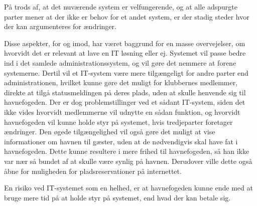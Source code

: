 På trods af, at det nuværende system er velfungerende, og at alle adspurgte parter mener at der ikke er behov for et andet system, er der stadig steder hvor der kan argumenteres for ændringer.


Disse aspekter, for og imod, har været baggrund for en masse overvejelser, om hvorvidt det er relevant at lave en IT løsning eller ej. Systemet vil passe bedre ind i det samlede administrationssystem, og vil gøre det nemmere at forene systemerne. Dertil vil et IT-system være mere tilgængeligt for andre parter end administrationen, hvilket kunne gøre det muligt for klubbernes medlemmer, direkte at tilgå statusmeldingen på deres plads, uden at skulle henvende sig til havnefogeden. Der er dog problemstillinger ved et sådant IT-system, siden det ikke vides hvorvidt medlemmerne vil udnytte en sådan funktion, og hvorvidt havnefogeden vil kunne holde styr på systemet, hvis tredjeparter foretager ændringer. Den øgede tilgængelighed vil også gøre det muligt at vise informationer om havnen til gæster, uden at de nødvendigvis skal have fat i havnefogeden. Dette kunne resultere i mere frihed til havnefogeden, så han ikke var nær så bundet af at skulle være synlig på havnen. Derudover ville dette også åbne for muligheden for pladsreservationer på internettet.

En risiko ved IT-systemet som en helhed, er at havnefogeden kunne ende med at bruge mere tid på at holde styr på systemet, end hvad der kan betale sig.

